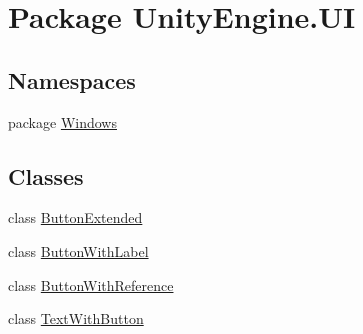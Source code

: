 \hypertarget{namespace_unity_engine_1_1_u_i}{}\section{Package Unity\+Engine.\+U\+I}
\label{namespace_unity_engine_1_1_u_i}
\subsection*{Namespaces}
\begin{DoxyCompactItemize}
\item 
package \hyperlink{namespace_unity_engine_1_1_u_i_1_1_windows}{Windows}
\end{DoxyCompactItemize}
\subsection*{Classes}
\begin{DoxyCompactItemize}
\item 
class \hyperlink{class_unity_engine_1_1_u_i_1_1_button_extended}{Button\+Extended}
\item 
class \hyperlink{class_unity_engine_1_1_u_i_1_1_button_with_label}{Button\+With\+Label}
\item 
class \hyperlink{class_unity_engine_1_1_u_i_1_1_button_with_reference}{Button\+With\+Reference}
\item 
class \hyperlink{class_unity_engine_1_1_u_i_1_1_text_with_button}{Text\+With\+Button}
\end{DoxyCompactItemize}
